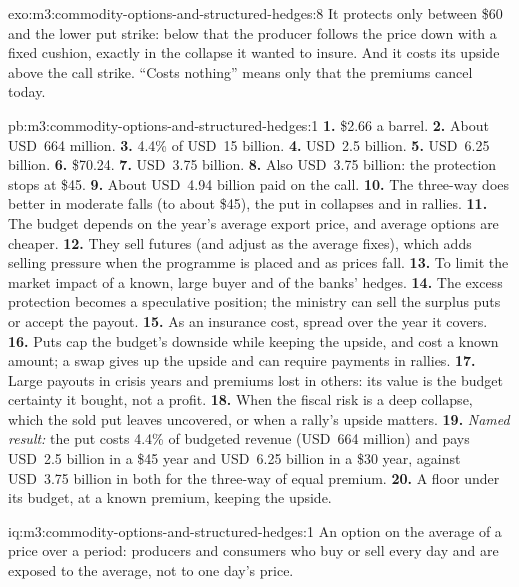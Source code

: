 \begin{solution}{exo:m3:commodity-options-and-structured-hedges:8}
It protects only between \$60 and the lower put strike: below that the producer follows the price down with a
fixed cushion, exactly in the collapse it wanted to insure. And it costs its upside above the call strike.
``Costs nothing'' means only that the premiums cancel today.
\end{solution}

\begin{solution}{pb:m3:commodity-options-and-structured-hedges:1}
\textbf{1.} \$2.66 a barrel. \textbf{2.} About USD~664 million. \textbf{3.} 4.4\% of USD~15 billion.
\textbf{4.} USD~2.5 billion. \textbf{5.} USD~6.25 billion. \textbf{6.} \$70.24. \textbf{7.} USD~3.75 billion.
\textbf{8.} Also USD~3.75 billion: the protection stops at \$45. \textbf{9.} About USD~4.94 billion paid on the
call. \textbf{10.} The three-way does better in moderate falls (to about \$45), the put in collapses and in
rallies. \textbf{11.} The budget depends on the year's average export price, and average options are cheaper.
\textbf{12.} They sell futures (and adjust as the average fixes), which adds selling pressure when the
programme is placed and as prices fall. \textbf{13.} To limit the market impact of a known, large buyer and of
the banks' hedges. \textbf{14.} The excess protection becomes a speculative position; the ministry can sell
the surplus puts or accept the payout. \textbf{15.} As an insurance cost, spread over the year it covers.
\textbf{16.} Puts cap the budget's downside while keeping the upside, and cost a known amount; a swap gives up
the upside and can require payments in rallies. \textbf{17.} Large payouts in crisis years and premiums lost
in others: its value is the budget certainty it bought, not a profit. \textbf{18.} When the fiscal risk is a
deep collapse, which the sold put leaves uncovered, or when a rally's upside matters. \textbf{19.}
\emph{Named result:} the put costs 4.4\% of budgeted revenue (USD~664 million) and pays USD~2.5 billion in a
\$45 year and USD~6.25 billion in a \$30 year, against USD~3.75 billion in both for the three-way of equal
premium. \textbf{20.} A floor under its budget, at a known premium, keeping the upside.
\end{solution}

\begin{solution}{iq:m3:commodity-options-and-structured-hedges:1}
An option on the average of a price over a period: producers and consumers who buy or sell every day and
are exposed to the average, not to one day's price.
\end{solution}

